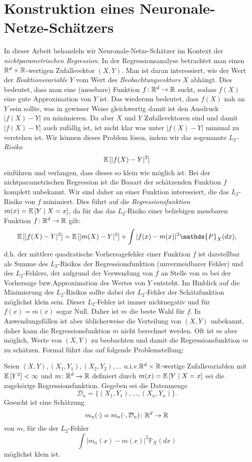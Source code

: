 \chapter{Konstruktion eines Neuronale-Netze-Schätzers}
\label{chap:2}

In dieser Arbeit behandeln wir Neuronale-Netze-Schätzer im Kontext der \emph{nichtparametrischen Regression}.
In der Regressionsanalyse betrachtet man einen $\mathbb{R}^d \times \mathbb{R}$-wertigen Zufallsvektor $(X,Y)$. Man ist daran interessiert, wie der Wert der \emph{Reaktionsvariable} $Y$ vom Wert des \emph{Beobachtungsvektors} $X$ abhängt. Dies bedeutet, dass man eine (messbare) Funktion $f\colon \mathbb{R}^d \to \mathbb{R}$ sucht, sodass $f(X)$ eine \glqq gute Approximation von $Y$\grqq{} ist. Das wiederum bedeutet, dass $f(X)$ nah an $Y$ sein sollte, was in gewisser Weise gleichwertig damit ist den Ausdruck $|f(X) - Y|$ zu \glqq minimieren\grqq. Da aber $X$ und $Y$ Zufallsvektoren sind und damit $|f(X) - Y|$ auch zufällig ist, ist nicht klar was unter \glqq $|f(X) - Y|$ minimal\grqq{} zu verstehen ist. Wir können dieses Problem lösen, indem wir das sogenannte \emph{$L_2$-Risiko} 
$$
\mathbb{E}\,[|f(X) - Y|^2]
$$
einführen und verlangen, dass dieses so klein wie möglich ist.
Bei der nichtparametrischen Regression ist die Bauart der schätzenden Funktion $f$ komplett unbekannt. Wir sind daher an einer Funktion interessiert, die das $L_2$-Risiko von $f$ minimiert. Dies führt auf die \emph{Regressionsfunktion} $m(x) = \mathbb{E}\,[Y \mid X = x]$, da für das das $L_2$-Risiko einer beliebigen messbaren Funktion $f\colon \mathbb{R}^d \to \mathbb{R}$  gilt:
$$\E[|f(X) - Y|^2] = \E[|m(X) - Y|^2] + \int|f(x) - m(x)|^2 \mathds{P}_X (dx),$$
d.h. der mittlere quadratische Vorhersagefehler einer Funktion $f$ ist darstellbar als Summe des $L_2$-Risikos der Regressionsfunktion (unvermeidbarer Fehler) und des $L_2$-Fehlers, der aufgrund der Verwendung von $f$ an Stelle von $m$ bei der Vorhersage bzw.\@ Approximation des Wertes von $Y$ entsteht. Im Hinblick auf die Minimierung des $L_2$-Risikos sollte dabei der $L_2$-Fehler der Schätzfunktion möglichst klein sein. Dieser $L_2$-Fehler ist immer nichtnegativ und für $f(x) = m(x)$ sogar Null. Daher ist $m$ die beste Wahl für $f.$
In Anwendungsfällen ist aber üblicherweise die Verteilung von $(X, Y)$ unbekannt, daher kann die Regressionsfunktion $m$ nicht berechnet werden. Oft ist es aber möglich, Werte von $(X, Y)$ zu beobachten und damit die Regressionsfunktion $m$ zu schätzen. Formal führt das auf folgende Problemstellung:
\begin{prblm}
\label{prblm:1}
Seien $(X, Y), (X_1, Y_1), (X_2, Y_2), \dots$ u.i.v.\@ $\mathbb{R}^d \times \mathbb{R}$-wertige Zufallsvariablen mit $\mathbb{E}\,[Y^2] < \infty$ und $m\colon\mathbb{R}^d \to \mathbb{R}$ definiert durch $m(x) = \mathbb{E}\,[Y \mid X = x]$ sei die zugehörige Regressionsfunktion. Gegeben sei die Datenmenge 
\begin{equation}
\label{dataset}
\mathcal{D}_n = \{(X_1, Y_1),\dots,(X_n, Y_n)\}.
\end{equation}
Gesucht ist eine Schätzung 
$$m_n(\cdot) = m_n(\cdot, \mathcal{D}_n)\colon\mathbb{R}^d \to \mathbb{R} $$
von $m$, für die der $L_2$-Fehler 
$$\int |m_n(x) - m(x)|^2 \mathds{P}_X(dx)$$
möglichst \glqq klein\grqq{} ist. 
\end{prblm}
